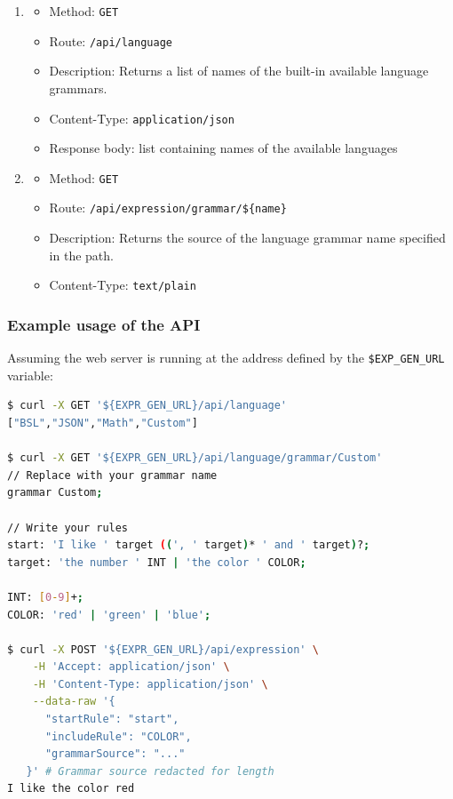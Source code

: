 \documentclass[]{usiinfbachelorproject}
\begin{document}
\begin{enumerate}
\item \begin{itemize}
      \item Method: \texttt{GET}
      \item Route: \texttt{/api/language}
      \item Description: Returns a list of names of the built-in available language grammars.
      \item Content-Type: \texttt{application/json}
      \item Response body: list containing names of the available languages
      \end{itemize}
\item \begin{itemize}
      \item Method: \texttt{GET}
      \item Route: \texttt{/api/expression/grammar/\$\{name\}}
      \item Description: Returns the source of the language grammar name specified in the path.
      \item Content-Type: \texttt{text/plain}
      \end{itemize}
\end{enumerate}

\subsubsection*{\textbf{Example usage of the API}}

Assuming the web server is running at the address defined by the
\texttt{\$EXP\_GEN\_URL} variable:

\begin{lstlisting}[caption={Example usage of the micro-service Web API}
                   label=user-usage-web-curl,
                   language=bash,
                   mathescape=false,
                   style=antlr]
$ curl -X GET '${EXPR_GEN_URL}/api/language'
["BSL","JSON","Math","Custom"]

$ curl -X GET '${EXPR_GEN_URL}/api/language/grammar/Custom'
// Replace with your grammar name
grammar Custom;

// Write your rules
start: 'I like ' target ((', ' target)* ' and ' target)?;
target: 'the number ' INT | 'the color ' COLOR;

INT: [0-9]+;
COLOR: 'red' | 'green' | 'blue';

$ curl -X POST '${EXPR_GEN_URL}/api/expression' \
    -H 'Accept: application/json' \
    -H 'Content-Type: application/json' \
    --data-raw '{
      "startRule": "start",
      "includeRule": "COLOR",
      "grammarSource": "..."
   }' # Grammar source redacted for length
I like the color red
\end{lstlisting}
\end{document}
